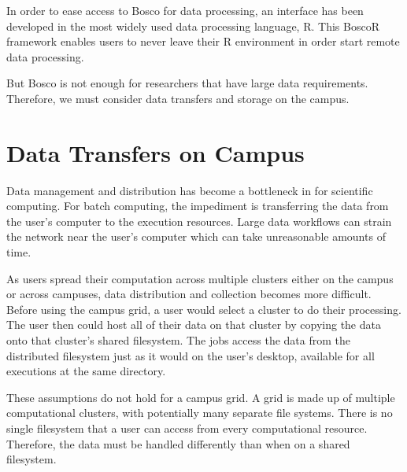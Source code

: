 In order to ease access to Bosco for data processing, an interface has been developed in the most widely used data processing language, R.  This BoscoR framework enables users to never leave their R environment in order start remote data processing.

But Bosco is not enough for researchers that have large data requirements.  Therefore, we must consider data transfers and storage on the campus.










\section{Data Transfers on Campus}

Data management and distribution has become a bottleneck in for scientific computing.  For batch computing, the impediment is transferring the data from the user's computer to the execution resources.  Large data workflows can strain the network near the user's computer which can take unreasonable amounts of time.

As users spread their computation across multiple clusters either on the campus or across campuses, data distribution and collection becomes more difficult.  Before using the campus grid, a user would select a cluster to do their processing.  The user then could host all of their data on that cluster by copying the data onto that cluster's shared filesystem.  The jobs access the data from the distributed filesystem just as it would on the user's desktop, available for all executions at the same directory.

These assumptions do not hold for a campus grid.  A grid is made up of multiple computational clusters, with potentially many separate file systems.  There is no single filesystem that a user can access from every computational resource.  Therefore, the data must be handled differently than when on a shared filesystem.  


